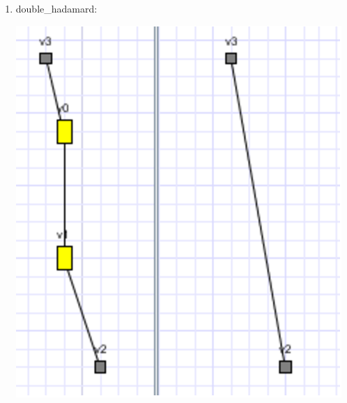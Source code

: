 \documentclass[a4paper,oneside]{book}
\begin{document}
\begin{enumerate}
\item double\_hadamard:
\begin{center}
\includegraphics[scale=1]{IMG/doubleH.eps}
\end{center}
\end{enumerate}

\backmatter
\nocite{*}
\renewcommand{\bibname}{Références bibliographiques}

\end{document}

